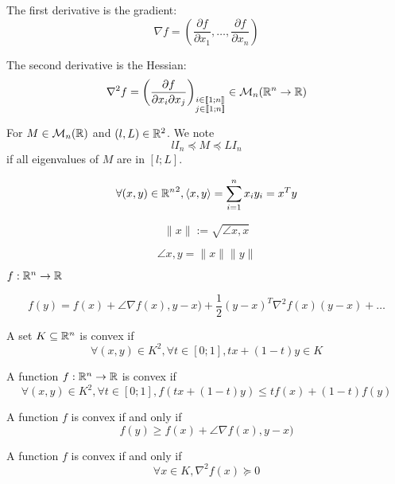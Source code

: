 The first derivative is the gradient:
\[
    \nabla f = \left( \frac{\partial f}{\partial x_1},\ldots, \frac{\partial f}{\partial x_n} \right)
\]

The second derivative is the Hessian:
\[
    \nabla^2 f = \left(\frac{\partial f}{\partial x_i\partial x_j} \right)_{\substack{i\in\llbracket 1;n\rrbracket\\ j\in\llbracket 1;n\rrbracket}} \in \mathcal{M}_n(\mathbb{R}^n \to \mathbb{R})
\]


\begin{notation}
    For $M\in\mathcal{M}_n(\mathbb{R})$ and $(l,L)\in\mathbb{R}^2$. We note
    \[
        lI_n  \preccurlyeq M \preccurlyeq LI_n
    \]
    if all eigenvalues of $M$ are in $[l;L]$.
\end{notation}

\begin{definition}
    \[
        \forall (x,y) \in {\mathbb{R}^n}^2, \langle x, y\rangle = \sum\limits_{i=1}^n x_i y_i = x^Ty
    \]
    
    \[
        \lVert x \rVert := \sqrt{\angle{x,x}}
    \]
\end{definition}

\begin{theorem}
    \[
        \angle{x,y} = \lVert x \rVert \lVert y \rVert
    \]
\end{theorem}

\begin{theorem}
    $f : \mathbb{R}^n\to\mathbb{R}$
    
    \[
        f(y) = f(x) + \angle{\nabla f(x),y-x)} + \frac{1}{2}(y-x)^T \nabla^2 f(x)(y-x) + \ldots
    \]
\end{theorem}

\begin{definition}
    A set $K\subseteq \mathbb{R}^n$ is convex if
    \[
        \forall (x,y) \in K^2, \forall t\in[0;1], tx+(1-t)y \in K
    \]
\end{definition}

\begin{definition}
    A function $f : \mathbb{R}^n \to \mathbb{R}$ is convex if
    \[
        \forall (x,y) \in K^2, \forall t\in[0;1], f(tx+(1-t)y) \leqslant tf(x) + (1-t)f(y)
    \]
\end{definition}

\begin{proposition}
    A function $f$ is convex if and only if
    \[
        f(y) \geqslant f(x) + \angle{\nabla f(x),y-x)}    
    \]
\end{proposition}

\begin{proposition}
    A function $f$ is convex if and only if
    \[
        \forall x\in K, \nabla^2 f(x) \succcurlyeq 0
    \]
\end{proposition}